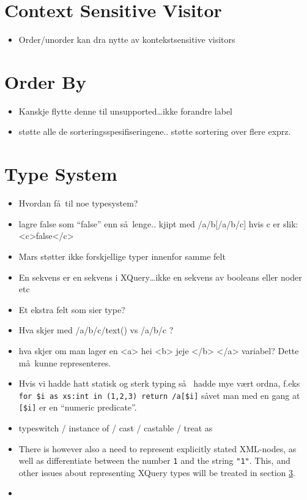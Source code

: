 



\section{Context Sensitive Visitor}
\label{sect:disc:contextSens}
\begin{itemize}
  \item Order/unorder kan dra nytte av kontekstsensitive visitors
\end{itemize}


\section{Order By}
\label{sect:disc:orderby}
\begin{itemize}
  \item Kanskje flytte denne til unsupported\ldots ikke forandre label
  \item st\o tte alle de sorteringsspesifiseringene.. st\o tte sortering over flere exprz.
\end{itemize}

\section{Type System}
\label{sect:disc:typeSystem}
\begin{itemize}
  \item Hvordan f\aa~til noe typesystem?
  \item lagre false som ``false'' enn s\aa~lenge.. kjipt med /a/b[/a/b/c] hvis c er slik: <c>false</c>
  \item Mars st\o tter ikke forskjellige typer innenfor samme felt
  \item En sekvens er en sekvens i XQuery\ldots ikke en sekvens av booleans
  eller noder etc
  \item Et ekstra felt som sier type?
  \item Hva skjer med /a/b/c/text() vs /a/b/c ?
  \item hva skjer om man lager en <a> hei <b> jeje </b> </a> variabel? Dette
  m\aa~kunne representeres.
  \item Hvis vi hadde hatt statisk og sterk typing s\aa~ hadde mye v\ae rt
  ordna, f.eks \verb!for $i as xs:int in (1,2,3) return /a[$i]! s\aa vet man
  med en gang at \verb![$i]! er en ``numeric predicate''.
  \item typeswitch / instance of / cast / castable / treat as
  \item There is however also a need to represent explicitly stated XML-nodes, as well
	as differentiate between the number \texttt{1} and the string \texttt{"1"}.
	This, and other issues about representing XQuery types will be treated in
	section \ref{sect:disc:typeSystem}.  \item 
\end{itemize}

